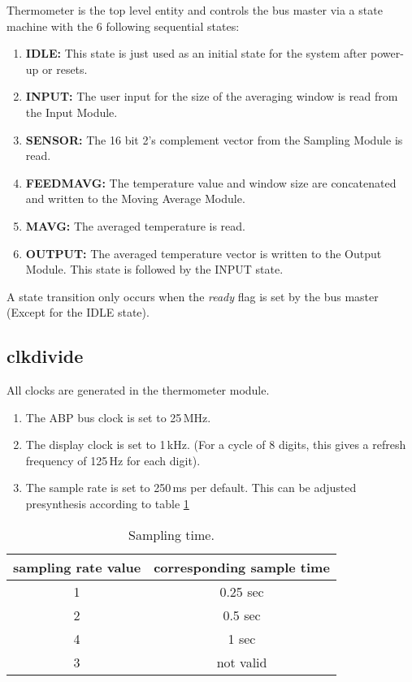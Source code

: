 \documentclass[%
	a4paper,
]
{article}
\begin{document}
Thermometer is the top level entity and controls the bus master via a state machine with the 6 following sequential states:
\begin{enumerate}
	\item \textbf{IDLE:} This state is just used as an initial state for the system after power-up or resets.
	\item \textbf{INPUT:} The user input for the size of the averaging window is read from the Input Module.
	\item \textbf{SENSOR:} The 16 bit 2's complement vector from the Sampling Module is read.
	\item \textbf{FEEDMAVG:} The temperature value and window size are concatenated and written to the Moving Average Module.
	\item \textbf{MAVG:} The averaged temperature is read.
	\item \textbf{OUTPUT:} The averaged temperature vector is written to the Output Module. This state is followed by the INPUT state.
\end{enumerate}
A state transition only occurs when the \textit{ready} flag is set by the bus master (Except for the IDLE state).\newline

\subsection{clkdivide}
All clocks are generated in the thermometer module.
\begin{enumerate}
	\item The ABP bus clock is set to 25\,MHz.
	\item The display clock is set to 1\,kHz. (For a cycle of 8 digits, this gives a refresh frequency of 125\,Hz for each digit).
	\item The sample rate is set to 250\,ms per default. This can be adjusted presynthesis according to table \ref{tab:sampling}
\end{enumerate}

\begin{table}[H]
\begin{center}
\begin{tabular}{|c|c|}

\hline
sampling rate value & corresponding sample time \\
\hline
1 & 0.25 sec \\
2 & 0.5 sec \\
4 & 1 sec \\
3 & not valid \\
\hline

\end{tabular}
\caption{Sampling time.}
\label{tab:sampling}
\end{center}
\end{table}
\end{document}
